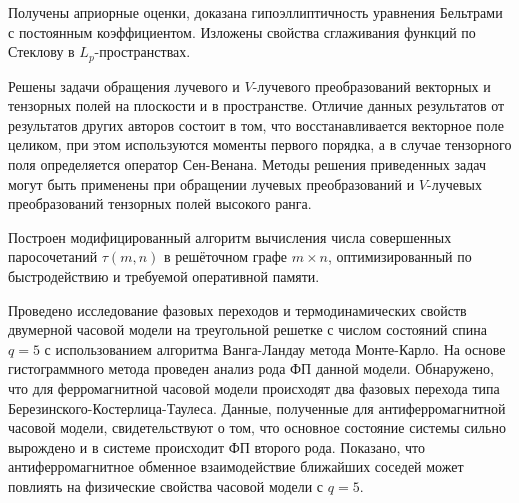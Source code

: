 Получены априорные оценки, доказана гипоэллиптичность уравнения Бельтрами с постоянным коэффициентом. Изложены свойства сглаживания функций по Стеклову в $L_p$-пространствах. 

Решены задачи обращения лучевого и $V$-лучевого преобразований векторных и тензорных полей на плоскости и в пространстве. Отличие данных результатов от результатов других авторов состоит в том, что восстанавливается векторное поле целиком, при этом используются моменты первого порядка, а в случае тензорного поля определяется оператор Сен-Венана.
Методы решения приведенных задач могут быть применены при обращении лучевых преобразований и $V$-лучевых преобразований тензорных полей высокого ранга. 

Построен модифицированный алгоритм вычисления числа совершенных паросочетаний \linebreak $\tau(m,n)$ в решёточном графе $m\times n$, оптимизированный по быстродействию и требуемой оперативной памяти. 

Проведено исследование фазовых переходов и термодинамических свойств двумерной часовой модели на треугольной решетке с числом состояний спина $q = 5$ с использованием алгоритма Ванга-Ландау метода Монте-Карло. На основе гистограммного метода проведен анализ рода ФП данной модели. Обнаружено, что для ферромагнитной часовой модели происходят два фазовых перехода типа Березинского-Костерлица-Таулеса. Данные, полученные для антиферромагнитной часовой модели, свидетельствуют о том, что основное состояние системы сильно вырождено и в системе происходит ФП второго рода. Показано, что антиферромагнитное обменное взаимодействие ближайших соседей может повлиять на физические свойства часовой модели с $q=5$. 